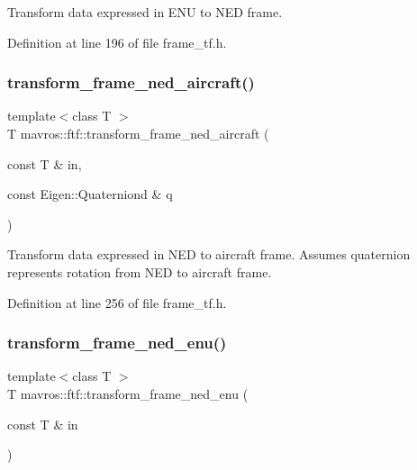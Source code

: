 Transform data expressed in E\+NU to N\+ED frame. 



Definition at line 196 of file frame\+\_\+tf.\+h.

\mbox{\label{group__nodelib_ga916fb57c10ef6a7109585245f512d4b2}} 
\subsubsection{\texorpdfstring{transform\_frame\_ned\_aircraft()}{transform\_frame\_ned\_aircraft()}}
{\footnotesize\ttfamily template$<$class T $>$ \\
T mavros\+::ftf\+::transform\+\_\+frame\+\_\+ned\+\_\+aircraft (\begin{DoxyParamCaption}\item[{const T \&}]{in,  }\item[{const Eigen\+::\+Quaterniond \&}]{q }\end{DoxyParamCaption})\hspace{0.3cm}{\ttfamily [inline]}}



Transform data expressed in N\+ED to aircraft frame. Assumes quaternion represents rotation from N\+ED to aircraft frame. 



Definition at line 256 of file frame\+\_\+tf.\+h.

\mbox{\label{group__nodelib_ga190188b4899aab8fde4d65de949535c9}} 
\subsubsection{\texorpdfstring{transform\_frame\_ned\_enu()}{transform\_frame\_ned\_enu()}}
{\footnotesize\ttfamily template$<$class T $>$ \\
T mavros\+::ftf\+::transform\+\_\+frame\+\_\+ned\+\_\+enu (\begin{DoxyParamCaption}\item[{const T \&}]{in }\end{DoxyParamCaption})\hspace{0.3cm}{\ttfamily [inline]}}



